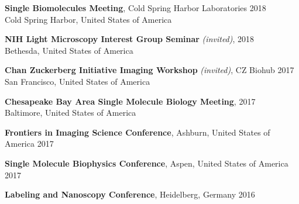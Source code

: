 \documentclass[margin,line]{res}
\begin{document}
\begin{resume}
\vspace*{-2.5mm}
{\bf Single Biomolecules Meeting}, Cold Spring Harbor Laboratories  \hfill 2018\\
Cold Spring Harbor, United States of America %

\vspace*{-2.5mm}
{\bf NIH Light Microscopy Interest Group Seminar} {\it (invited)},   \hfill 2018\\
 Bethesda, United States of America %

\vspace*{-2.5mm}
{\bf Chan Zuckerberg Initiative Imaging Workshop} {\it (invited)}, CZ Biohub \hfill 2017\\
 San Francisco, United States of America%

\vspace*{-2.5mm}
{\bf Chesapeake Bay Area Single Molecule Biology Meeting},  \hfill 2017\\
Baltimore, United States of America%

\vspace*{-2.5mm}
{\bf Frontiers in Imaging Science Conference}, Ashburn, United States of America \hfill 2017%

\vspace*{-2.5mm}
{\bf Single Molecule Biophysics Conference}, Aspen, United States of America \hfill 2017%

\vspace*{-2.5mm}
{\bf Labeling and Nanoscopy Conference}, Heidelberg, Germany \hfill 2016%


\end{resume}
\end{document}
